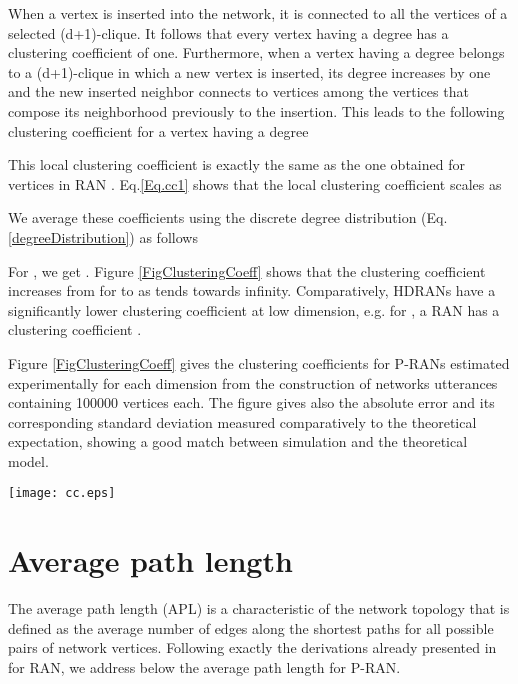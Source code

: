 \documentclass[11pt]{iopart}
\begin{document}
When a vertex is inserted into the network, it is connected to all the vertices of a selected (d+1)-clique. It follows that every vertex having a degree  has a clustering coefficient of one. Furthermore, when a vertex  having a degree   belongs to a (d+1)-clique in which a new vertex is inserted, its degree increases by one and the new inserted neighbor connects to  vertices among the  vertices that compose its neighborhood previously to the insertion. This leads to the following clustering coefficient for a vertex having a degree 



This local clustering coefficient is exactly the same as the one obtained for vertices in RAN \cite{zhang-2006a}. Eq.\ref{Eq.cc1} shows that the local clustering coefficient scales as 

We average these coefficients using the discrete degree distribution (Eq.\ref{degreeDistribution}) as follows



For , we get . Figure \ref{FigClusteringCoeff} shows that the clustering coefficient increases from  for  to  as  tends towards infinity. Comparatively, HDRANs have a significantly lower clustering coefficient at low dimension, e.g. for , a RAN has a clustering coefficient . 

Figure \ref{FigClusteringCoeff} gives the clustering coefficients for P-RANs estimated experimentally for each dimension from the construction of   networks utterances containing 100000 vertices each. The figure gives also the absolute error and its corresponding standard deviation measured comparatively to the theoretical expectation, showing a good match between simulation and the theoretical model.

\begin{figure*}[htbp]
\centering
\texttt{[image: cc.eps]}
\caption{Clustering coefficient of a P-RAN as a function of the dimension. Error and standard deviation to theory are given on the right vertical axis.}
\label{FigClusteringCoeff}
\end{figure*}



\section{Average path length}

The average path length (APL) is a characteristic of the network topology that is defined as the average number of edges along the shortest paths for all possible pairs of network vertices. Following exactly the derivations already presented in \cite{zhou-2004,zhang-2007-380} for RAN, we address below the average path length for P-RAN.
\end{document}
